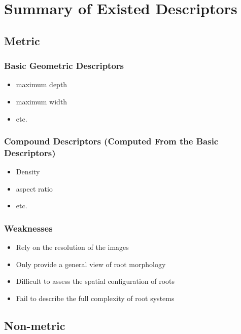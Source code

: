 


\section{Summary of Existed Descriptors}
 
   \subsection{Metric}

     \subsubsection{Basic Geometric Descriptors}
       \begin{itemize}
         \item maximum depth
         \item maximum width
         \item etc.
       \end{itemize}
       
     \subsubsection{Compound Descriptors (Computed From the Basic Descriptors)}
       \begin{itemize}
         \item Density
         \item aspect ratio
         \item etc.
       \end{itemize}
       
     \subsubsection{Weaknesses}

       \begin{itemize}
         \item Rely on the resolution of the images \cite{balduzzi2017reshaping}
         \item Only provide a general view of root morphology \cite{balduzzi2017reshaping}
         \item Difficult to assess the spatial configuration of roots
         \item Fail to describe the full complexity of root systems
       \end{itemize}

       
   \subsection{Non-metric}
       
